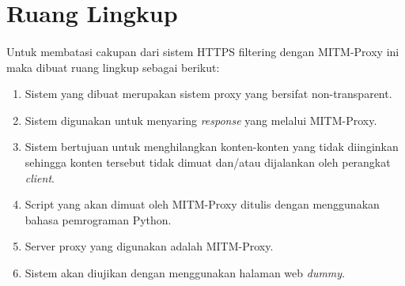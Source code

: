 \documentclass[./bab_1.tex]{subfiles}
\begin{document}
\section{Ruang Lingkup}
  \paragraph*{} Untuk membatasi cakupan dari sistem HTTPS filtering dengan
    MITM-Proxy ini maka dibuat ruang lingkup sebagai berikut:
    \begin{enumerate}
      \item Sistem yang dibuat merupakan sistem proxy yang
      bersifat non-transparent.
      \item Sistem digunakan untuk menyaring \textit{response}
      yang melalui MITM-Proxy.
      \item Sistem bertujuan untuk menghilangkan konten-konten
      yang tidak diinginkan sehingga konten tersebut tidak
      dimuat dan/atau dijalankan oleh perangkat \textit{client}.
      \item Script yang akan dimuat oleh MITM-Proxy ditulis
      dengan menggunakan bahasa pemrograman Python.
      \item Server proxy yang digunakan adalah MITM-Proxy.
      \item Sistem akan diujikan dengan menggunakan halaman
      web \textit{dummy}.
    \end{enumerate}
\end{document}
